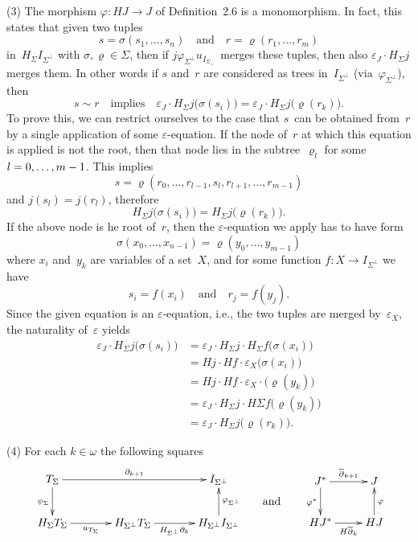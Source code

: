 \documentclass{entcs}
\newcommand{\llll}{l}
\begin{document}
\begin{pf}
(3) The morphism $\varphi\colon HJ\to J$ of Definition~2.6 is a
monomorphism. In fact, this states that given two tuples
\[s=\sigma(s_1,\dots,s_n)\quad\text{and}\quad
r=\varrho(r_1,\dots,r_m)\]
in~$H_\Sigma I_{\Sigma^\perp}$ with $\sigma,\varrho\in\Sigma$, then
if $j\varphi_{\Sigma^\perp}u_{I_{\Sigma_\perp}}$~merges these tuples, then also
$\varepsilon_J{\cdot}H_\Sigma j$ merges them. In other words if $s$
and~$r$ are considered as trees in~$I_{\Sigma^\perp}$
(via~$\varphi_{\Sigma^\perp}$), then
\[s\sim r\quad\text{implies}\quad \varepsilon_J{\cdot}H_\Sigma
j\bigl(\sigma(s_i)\bigr) = \varepsilon_J{\cdot}H_\Sigma
j\bigl(\varrho(r_k)\bigr).\]
To prove this, we can restrict ourselves to the case that $s$~can be
obtained from~$r$ by a single  application of some
$\varepsilon$-equation. If the node of~$r$ at which this equation is
applied is not the root,
then that node lies in the subtree~$\varrho_{\llll}$
for some $\llll=0,\dots,m-\nolinebreak1$. This implies
\[s=\varrho(r_0,\dots,r_{\llll-1},s_{\llll},r_{\llll+1},\dots,r_{m-1})\]
and $j(s_{\llll})=j(r_{\llll})$, therefore
\[H_\Sigma j\bigl(\sigma(s_i)\bigr)=H_\Sigma
j\bigl(\varrho(r_k)\bigr).\]
If the above node is he root of~$r$, then the $\varepsilon$-equation
we apply has to have form
\[\sigma(x_0,\dots,x_{n-1})=\varrho(y_0,\dots,y_{m-1})\]
where $x_i$ and~$y_k$ are variables of a set~$X$, and for some
function $f\colon X\to I_{\Sigma^\perp}$ we have
\[s_i=f(x_i)\quad\text{and}\quad r_j=f(y_j).\]
Since the given equation is an $\varepsilon$-equation, i.e., the two
tuples are merged by~$\varepsilon_{X}$, the naturality
of~$\varepsilon$ yields
\begin{align*}
\varepsilon_J{\cdot}H_\Sigma j\bigl(\sigma(s_i)\bigr)
&=\varepsilon_J{\cdot}H_\Sigma j{\cdot}H_\Sigma f\bigl(\sigma(x_i)\bigr)\\
&=Hj{\cdot}Hf{\cdot}\varepsilon_X\bigl(\sigma(x_i)\bigr)\\
&=Hj{\cdot}Hf{\cdot}\varepsilon_X{\cdot}\bigl(\varrho(y_k)\bigr)\\
&=\varepsilon_J{\cdot}H_\Sigma j{\cdot}H\Sigma
f\bigl(\varrho(y_k)\bigr)\\
&=\varepsilon_J{\cdot}H_\Sigma j\bigl(\varrho(r_k)\bigr).
\end{align*}

(4) For each $k\in\omega$ the following squares
\vspace{1.5mm}
\[
\vcenter{
\xy
\xymatrixcolsep{3pc}
\xymatrix{
T_\Sigma
\ar[0,2]^-{\partial_{k+1}}
\ar[1,0]_{\psi_\Sigma}
&
&
I_{\Sigma^\perp}
\\
H_\Sigma T_\Sigma
\ar[0,1]_-{u_{T_\Sigma}}
&
H_{\Sigma^\perp}T_{\Sigma}
\ar[0,1]_-{H_{\Sigma^\perp}\partial_k}
&
H_{\Sigma^\perp}I_{\Sigma^\perp}
\ar[-1,0]_{\varphi_{\Sigma^\perp}}
}
\endxy
}
\qquad
\text{and}
\qquad
\vcenter{
\xy
\xymatrix{
J^*
\ar[0,1]^-{\overline{\partial}_{k+1}}
\ar[1,0]_{\varphi^*}
&
J
\\
HJ^*
\ar[0,1]_-{H\overline{\partial}_k}
&
HJ
\ar[-1,0]_{\varphi}
}
\endxy
}
\]\vspace{1mm}


\end{pf}
\end{document}
